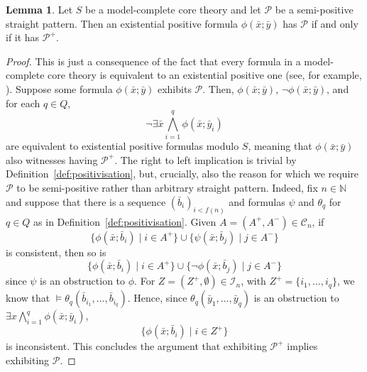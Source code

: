 \documentclass{amsart}
\theoremstyle{definition}
\newtheorem{lemma}[theorem]{Lemma}
\newtheorem{fact}[theorem]{Fact}
\theoremstyle{remark}
\numberwithin{equation}{section}
\newcommand{\pau}[1]{\textcolor{blue}{#1}}
\begin{document}



\begin{lemma}\label{normiffpos} Let $S$ be a model-complete core theory and let $\mathcal{P}$ be a semi-positive straight pattern. Then %
an {existential positive} formula $\phi(\bar{x};\bar{y})$  has $\mathcal{P}$ if and only if it has $\mathcal{P}^+$.
\end{lemma}
\begin{proof} This is just a consequence of the fact that every formula in a model-complete core theory is equivalent to an existential positive one (see, for example,  \cite[Proposition 2.6.13]{bodirsky2021complexity}). Suppose some formula $\phi(\bar{x};\bar{y})$ exhibits $\mathcal{P}$. Then, $\phi(\bar{x};\bar{y})$, $\neg\phi(\bar{x};\bar{y})$, and for each
$q\in Q$, 
\[\neg\exists \bar{x}\bigwedge_{i=1}^q\phi(\bar{x}; \bar{y}_i)\]
are equivalent to existential positive formulas modulo $S$, meaning that $\phi(\bar{x};\bar{y})$ also witnesses having $\mathcal{P}^+$. 
The right to left implication is trivial by Definition~\ref{def:positivisation}, but, crucially, also the reason for which we require $\mathcal{P}$ to be semi-positive rather than arbitrary straight pattern. Indeed, fix $n\in\mathbb{N}$ and suppose that there is a sequence $(\bar{b}_i)_{i<f(n)}$ and formulas $\psi$ and {$\theta_q$ for $q\in Q$} as in Definition~\ref{def:positivisation}. Given $A=(A^+, A^-)\in\mathcal{C}_n$, if
\[\{\phi(\bar{x};\bar{b}_i)\mid i\in A^+\}\cup\{\psi(\bar{x};\bar{b}_j)\mid j\in A^-\}\]
is consistent, then so is 
\[\{\phi(\bar{x};\bar{b}_i)\mid i\in A^+\}\cup\{\neg\phi(\bar{x};\bar{b}_j)\mid j\in A^-\}\]
since $\psi$ is an obstruction to $\phi$. For $Z=(Z^{+}, \emptyset)\in\mathcal{I}_n$, with $Z^+=\{i_1, \dots, i_q\}$, we know that $\vDash \theta_q(\bar{b}_{i_1}, \dots, \bar{b}_{i_q})$. Hence, since $\theta_q(\bar{y}_1, \dots, \bar{y}_q)$ is an obstruction to $\exists x\bigwedge_{i=1}^q\phi(\bar{x}; \bar{y}_i)$, 
 \[\{\phi(\bar{x};\bar{b}_i)\mid i\in Z^+\}\]
    is inconsistent. This concludes the argument that exhibiting $\mathcal{P}^+$ implies exhibiting $\mathcal{P}$.
\end{proof}
\end{document}
